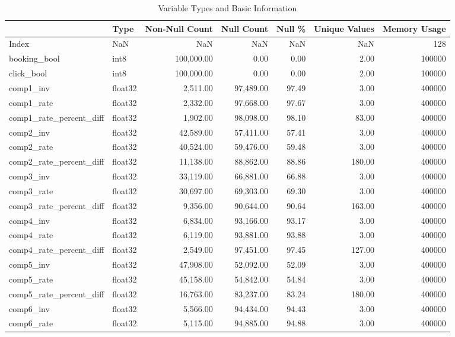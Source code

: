 \begin{table}
\caption{Variable Types and Basic Information}
\label{tab:data_types}
\begin{tabular}{llrrrrr}
\toprule
 & Type & Non-Null Count & Null Count & Null \% & Unique Values & Memory Usage \\
\midrule
Index & NaN & NaN & NaN & NaN & NaN & 128 \\
booking\_bool & int8 & 100,000.00 & 0.00 & 0.00 & 2.00 & 100000 \\
click\_bool & int8 & 100,000.00 & 0.00 & 0.00 & 2.00 & 100000 \\
comp1\_inv & float32 & 2,511.00 & 97,489.00 & 97.49 & 3.00 & 400000 \\
comp1\_rate & float32 & 2,332.00 & 97,668.00 & 97.67 & 3.00 & 400000 \\
comp1\_rate\_percent\_diff & float32 & 1,902.00 & 98,098.00 & 98.10 & 83.00 & 400000 \\
comp2\_inv & float32 & 42,589.00 & 57,411.00 & 57.41 & 3.00 & 400000 \\
comp2\_rate & float32 & 40,524.00 & 59,476.00 & 59.48 & 3.00 & 400000 \\
comp2\_rate\_percent\_diff & float32 & 11,138.00 & 88,862.00 & 88.86 & 180.00 & 400000 \\
comp3\_inv & float32 & 33,119.00 & 66,881.00 & 66.88 & 3.00 & 400000 \\
comp3\_rate & float32 & 30,697.00 & 69,303.00 & 69.30 & 3.00 & 400000 \\
comp3\_rate\_percent\_diff & float32 & 9,356.00 & 90,644.00 & 90.64 & 163.00 & 400000 \\
comp4\_inv & float32 & 6,834.00 & 93,166.00 & 93.17 & 3.00 & 400000 \\
comp4\_rate & float32 & 6,119.00 & 93,881.00 & 93.88 & 3.00 & 400000 \\
comp4\_rate\_percent\_diff & float32 & 2,549.00 & 97,451.00 & 97.45 & 127.00 & 400000 \\
comp5\_inv & float32 & 47,908.00 & 52,092.00 & 52.09 & 3.00 & 400000 \\
comp5\_rate & float32 & 45,158.00 & 54,842.00 & 54.84 & 3.00 & 400000 \\
comp5\_rate\_percent\_diff & float32 & 16,763.00 & 83,237.00 & 83.24 & 180.00 & 400000 \\
comp6\_inv & float32 & 5,566.00 & 94,434.00 & 94.43 & 3.00 & 400000 \\
comp6\_rate & float32 & 5,115.00 & 94,885.00 & 94.88 & 3.00 & 400000 \\

\end{tabular}
\end{table}
